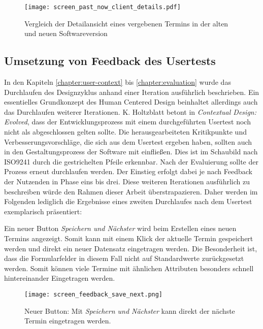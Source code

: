 \begin{figure}[H]
    \caption{Vergleich der Detailansicht eines vergebenen Termins in der alten und neuen Softwareversion}
    \centering
    \texttt{[image: screen\_past\_now\_client\_details.pdf]}
\end{figure}

\subsection*{Umsetzung von Feedback des Usertests}
\label{paragraph:weitereIteration}

In den Kapiteln \ref{chapter:user-context} bis \ref{chapter:evaluation} wurde
das Durchlaufen des Designzyklus anhand einer Iteration ausführlich
beschrieben. Ein essentielles Grundkonzept des Human Centered Design beinhaltet
allerdings auch das Durchlaufen weiterer Iterationen\cite{hcd}. K. Holtzblatt
betont in \textit{Contextual Design: Evolved}, dass der Entwicklungsprozess mit
einem durchgeführten Usertest noch nicht als abgeschlossen gelten sollte. Die
herausgearbeiteten Kritikpunkte und Verbesserungsvorschläge, die sich aus dem
Usertest ergeben haben, sollten auch in den Gestaltungsprozess der Software mit
einfließen\cite{holtzblattCDEvolved}. Dies ist im Schaubild nach ISO9241 durch
die gestrichelten Pfeile erkennbar. Nach der Evaluierung sollte der Prozess
erneut durchlaufen werden. Der Einstieg erfolgt dabei je nach Feedback der
Nutzenden in Phase eins bis drei\cite{ISO9241}. Diese weiteren Iterationen
ausführlich zu beschreiben würde den Rahmen dieser Arbeit überstrapazieren.
Daher werden im Folgenden lediglich die Ergebnisse eines zweiten Durchlaufes
nach dem Usertest exemplarisch präsentiert:

Ein neuer Button \textit{Speichern und Nächster} wird beim Erstellen eines
neuen Termins angezeigt. Somit kann mit einem Klick der aktuelle Termin
gespeichert werden und direkt ein neuer Datensatz eingetragen werden. Die
Besonderheit ist, dass die Formularfelder in diesem Fall nicht auf
Standardwerte zurückgesetzt werden. Somit können viele Termine mit ähnlichen
Attributen besonders schnell hintereinander Eingetragen werden.

\begin{figure}[H]
    \caption{Neuer Button: Mit \textit{Speichern und Nächster} kann direkt der nächste Termin eingetragen werden.}
    \centering
    \texttt{[image: screen\_feedback\_save\_next.png]}
\end{figure}

